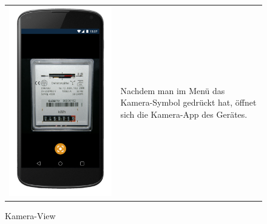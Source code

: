 \begin{figure}[h]
\begin{tabularx}{\textwidth}{X  X}
	\includegraphics[scale = 0.155]{img/AndroidMockup/SystemCamera} \caption{Kamera-View}  & Nachdem man im Menü das Kamera-Symbol gedrückt hat, öffnet sich die Kamera-App des Gerätes. \\ 
\end{tabularx}
\end{figure}

